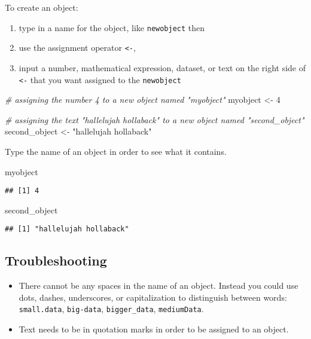 \documentclass[]{book}
\newenvironment{Shaded}{\begin{snugshade}}{\end{snugshade}}
\newcommand{\DecValTok}[1]{\textcolor[rgb]{0.00,0.00,0.81}{{#1}}}
\newcommand{\StringTok}[1]{\textcolor[rgb]{0.31,0.60,0.02}{{#1}}}
\newcommand{\CommentTok}[1]{\textcolor[rgb]{0.56,0.35,0.01}{\textit{{#1}}}}
\newcommand{\NormalTok}[1]{{#1}}
\providecommand{\tightlist}{%
  \setlength{\itemsep}{0pt}\setlength{\parskip}{0pt}}
\begin{document}
To create an object:

\begin{enumerate}
\def\labelenumi{\arabic{enumi}.}
\tightlist
\item
  type in a name for the object, like \texttt{newobject} then
\item
  use the assignment operator \texttt{\textless{}-},
\item
  input a number, mathematical expression, dataset, or text on the right
  side of \texttt{\textless{}-} that you want assigned to the
  \texttt{newobject}
\end{enumerate}

\begin{Shaded}
\begin{Highlighting}[]
\CommentTok{# assigning the number 4 to a new object named "myobject"}
\NormalTok{myobject <-}\StringTok{ }\DecValTok{4}

\CommentTok{# assigning the text "hallelujah hollaback" to a new object named "second_object"}
\NormalTok{second_object <-}\StringTok{ "hallelujah hollaback"}
\end{Highlighting}
\end{Shaded}

Type the name of an object in order to see what it contains.

\begin{Shaded}
\begin{Highlighting}[]
\NormalTok{myobject}
\end{Highlighting}
\end{Shaded}

\begin{verbatim}
## [1] 4
\end{verbatim}

\begin{Shaded}
\begin{Highlighting}[]
\NormalTok{second_object}
\end{Highlighting}
\end{Shaded}

\begin{verbatim}
## [1] "hallelujah hollaback"
\end{verbatim}

\subsection{Troubleshooting}\label{troubleshooting-1}

\begin{itemize}
\tightlist
\item
  There cannot be any spaces in the name of an object. Instead you could
  use dots, dashes, underscores, or capitalization to distinguish
  between words: \texttt{small.data}, \texttt{big-data},
  \texttt{bigger\_data}, \texttt{mediumData}.
\item
  Text needs to be in quotation marks in order to be assigned to an
  object.
\end{itemize}
\end{document}
